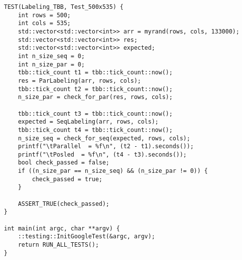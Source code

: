 \documentclass{report}
\begin{document}
\begin{lstlisting}
TEST(Labeling_TBB, Test_500x535) {
    int rows = 500;
    int cols = 535;
    std::vector<std::vector<int>> arr = myrand(rows, cols, 133000);
    std::vector<std::vector<int>> res;
    std::vector<std::vector<int>> expected;
    int n_size_seq = 0;
    int n_size_par = 0;
    tbb::tick_count t1 = tbb::tick_count::now();
    res = ParLabeling(arr, rows, cols);
    tbb::tick_count t2 = tbb::tick_count::now();
    n_size_par = check_for_par(res, rows, cols);

    tbb::tick_count t3 = tbb::tick_count::now();
    expected = SeqLabeling(arr, rows, cols);
    tbb::tick_count t4 = tbb::tick_count::now();
    n_size_seq = check_for_seq(expected, rows, cols);
    printf("\tParallel  = %f\n", (t2 - t1).seconds());
    printf("\tPosled  = %f\n", (t4 - t3).seconds());
    bool check_passed = false;
    if ((n_size_par == n_size_seq) && (n_size_par != 0)) {
        check_passed = true;
    }

    ASSERT_TRUE(check_passed);
}

int main(int argc, char **argv) {
    ::testing::InitGoogleTest(&argc, argv);
    return RUN_ALL_TESTS();
}

\end{lstlisting}
\end{document}
